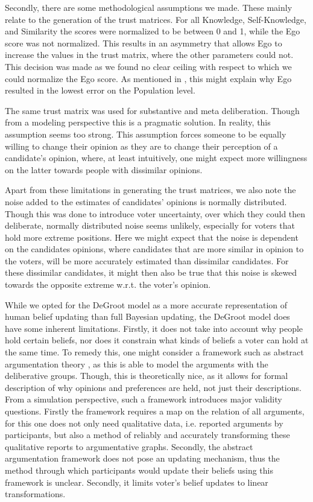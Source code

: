 Secondly, there are some methodological assumptions we made. These mainly
relate to the generation of the trust matrices. For all Knowledge,
Self-Knowledge, and Similarity the scores were normalized to be between 0 and
1, while the Ego score was not normalized. This results in an asymmetry that
allows Ego to increase the values in the trust matrix, where the other
parameters could not. This decision was made as we found no clear ceiling
with respect to which we could normalize the Ego score. As mentioned in ,
this might explain why Ego resulted in the lowest error on the Population level.

The same trust matrix was used for substantive and meta deliberation. Though
from a modeling perspective this is a pragmatic solution. In reality, this
assumption seems too strong. This assumption forces someone to be equally
willing to change their opinion as they are to change their perception of a
candidate's opinion, where, at least intuitively, one might expect more
willingness on the latter towards people with dissimilar opinions.


Apart from these limitations in generating the trust matrices, we also note the
noise added to the estimates of candidates' opinions is normally distributed.
Though this was done to introduce voter uncertainty, over which they could then
deliberate, normally distributed noise seems unlikely, especially for voters
that hold more extreme positions. Here we might expect that the noise is
dependent on the candidates opinions, where candidates that are more similar in
opinion to the voters, will be more accurately estimated than dissimilar
candidates. For these dissimilar candidates, it might then also be true that
this noise is skewed towards the opposite extreme w.r.t. the voter's opinion.

While we opted for the DeGroot model as a more accurate representation of human
belief updating than full Bayesian updating, the DeGroot model does have some
inherent limitations. Firstly, it does not take into account why people hold
certain beliefs, nor does it constrain what kinds of beliefs a voter can hold
at the same time. To remedy this, one might consider a framework such as
abstract argumentation theory \cite{dungAcceptabilityArgumentsIts1995}, as
this is able to model the arguments with the deliberative groups. Though, this
is theoretically nice, as it allows for formal description of why opinions and
preferences are held, not just their descriptions. From a simulation
perspective, such a framework introduces major validity questions. Firstly the
framework requires a map on the relation of all arguments, for this one does
not only need qualitative data, i.e. reported arguments by participants, but
also a method of reliably and accurately transforming these qualitative reports
to argumentative graphs. Secondly, the abstract argumentation framework does
not pose an updating mechanism, thus the method through which participants
would update their beliefs using this framework is unclear. Secondly, it limits
voter's belief updates to linear transformations.


